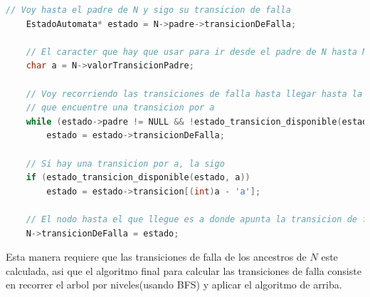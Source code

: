 \documentclass{article}
\begin{document}
\begin{lstlisting}[language=C]
    // Voy hasta el padre de N y sigo su transicion de falla
    EstadoAutomata* estado = N->padre->transicionDeFalla;

    // El caracter que hay que usar para ir desde el padre de N hasta N
    char a = N->valorTransicionPadre;

    // Voy recorriendo las transiciones de falla hasta llegar hasta la raiz o hasta
    // que encuentre una transicion por a
    while (estado->padre != NULL && !estado_transicion_disponible(estado, a))
        estado = estado->transicionDeFalla;
    
    // Si hay una transicion por a, la sigo
    if (estado_transicion_disponible(estado, a))
        estado = estado->transicion[(int)a - 'a'];
    
    // El nodo hasta el que llegue es a donde apunta la transicion de falla de N
    N->transicionDeFalla = estado;
\end{lstlisting}

Esta manera requiere que las transiciones de falla de los ancestros de $N$ este calculada, asi que el algoritmo
final para calcular las transiciones de falla consiste en recorrer el arbol por niveles(usando BFS) y aplicar el algoritmo
de arriba.
\end{document}

